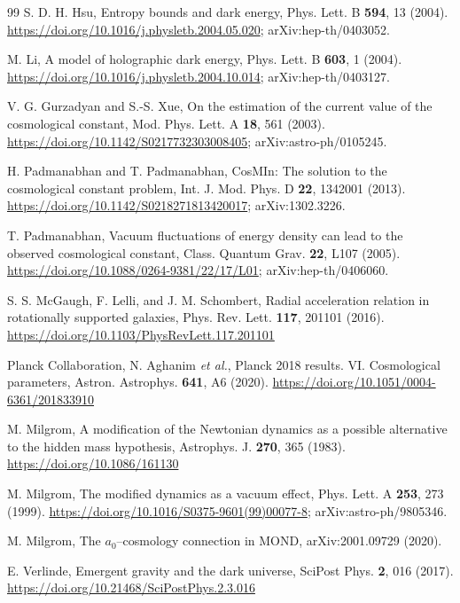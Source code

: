 \documentclass[aps,prd,twocolumn,superscriptaddress,nofootinbib,showkeys]{revtex4-2}
\begin{document}
\begin{thebibliography}{99}
 S. D. H. Hsu, Entropy bounds and dark energy, Phys. Lett. B \textbf{594}, 13 (2004). \url{https://doi.org/10.1016/j.physletb.2004.05.020}; arXiv:hep-th/0403052.

 M. Li, A model of holographic dark energy, Phys. Lett. B \textbf{603}, 1 (2004). \url{https://doi.org/10.1016/j.physletb.2004.10.014}; arXiv:hep-th/0403127.

 V. G. Gurzadyan and S.-S. Xue, On the estimation of the current value of the cosmological constant, Mod. Phys. Lett. A \textbf{18}, 561 (2003). \url{https://doi.org/10.1142/S0217732303008405}; arXiv:astro-ph/0105245.

 H. Padmanabhan and T. Padmanabhan, CosMIn: The solution to the cosmological constant problem, Int. J. Mod. Phys. D \textbf{22}, 1342001 (2013). \url{https://doi.org/10.1142/S0218271813420017}; arXiv:1302.3226.

 T. Padmanabhan, Vacuum fluctuations of energy density can lead to the observed cosmological constant, Class. Quantum Grav. \textbf{22}, L107 (2005). \url{https://doi.org/10.1088/0264-9381/22/17/L01}; arXiv:hep-th/0406060.

 S. S. McGaugh, F. Lelli, and J. M. Schombert, Radial acceleration relation in rotationally supported galaxies, Phys. Rev. Lett. \textbf{117}, 201101 (2016). \url{https://doi.org/10.1103/PhysRevLett.117.201101}

 Planck Collaboration, N. Aghanim \emph{et al.}, Planck 2018 results. VI. Cosmological parameters, Astron. Astrophys. \textbf{641}, A6 (2020). \url{https://doi.org/10.1051/0004-6361/201833910}

 M. Milgrom, A modification of the Newtonian dynamics as a possible alternative to the hidden mass hypothesis, Astrophys. J. \textbf{270}, 365 (1983). \url{https://doi.org/10.1086/161130}

 M. Milgrom, The modified dynamics as a vacuum effect, Phys. Lett. A \textbf{253}, 273 (1999). \url{https://doi.org/10.1016/S0375-9601(99)00077-8}; arXiv:astro-ph/9805346.

 M. Milgrom, The $a_0$--cosmology connection in MOND, arXiv:2001.09729 (2020).

 E. Verlinde, Emergent gravity and the dark universe, SciPost Phys. \textbf{2}, 016 (2017). \url{https://doi.org/10.21468/SciPostPhys.2.3.016}


\end{thebibliography}
\end{document}
